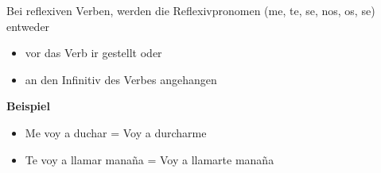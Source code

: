 \documentclass[10pt,spanish]{report}
\begin{document}
Bei reflexiven Verben, werden die Reflexivpronomen (me, te, se, nos, os, se) entweder
\begin{itemize}
  \item vor das Verb ir gestellt oder
  \item an den Infinitiv des Verbes angehangen
\end{itemize}
\bigskip
\textbf{Beispiel}
\begin{itemize}
\item Me voy a duchar = Voy a durcharme
\item Te voy a llamar mana\~{n}a = Voy a llamarte mana\~{n}a
\end{itemize}

\newpage
\end{document}
